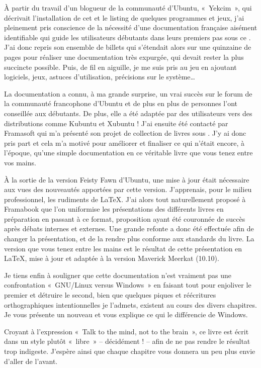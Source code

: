 À partir du travail d'un blogueur de la communauté d'Ubuntu, «~Yekcim~», qui décrivait l'installation de cet  et le listing de quelques programmes et jeux, j'ai pleinement pris conscience de la nécessité d'une documentation française aisément identifiable qui guide les utilisateurs débutants dans leurs premiers pas sous ce . J'ai donc repris son ensemble de billets qui s'étendait alors sur une quinzaine de pages pour réaliser une documentation très expurgée, qui devait rester la plus succincte possible. Puis, de fil en aiguille, je me suis pris au jeu en ajoutant logiciels, jeux, astuces d'utilisation, précisions sur le système\ldots{}\par
La documentation a connu, à ma grande surprise, un vrai succès sur le forum de la communauté francophone d'Ubuntu et de plus en plus de personnes l'ont conseillée aux débutants. De plus, elle a été adaptée par des utilisateurs vers des distributions comme Kubuntu et Xubuntu ! J'ai ensuite été contacté par Framasoft qui m'a présenté son projet de collection de livres sous . J'y ai donc pris part et cela m'a motivé pour améliorer et finaliser ce qui n'était encore, à l'époque, qu'une simple documentation en ce véritable livre que vous tenez entre vos mains.\par
À la sortie de la version Feisty Fawn d'Ubuntu, une mise à jour était nécessaire aux vues des nouveautés apportées par cette version. J'apprenais, pour le milieu professionnel, les rudiments de \LaTeX{}. J'ai alors tout naturellement proposé à Framabook que l'on uniformise les présentations des différents livres en préparation en passant à ce format, proposition ayant été couronnée de succès après débats internes et externes. Une grande refonte a donc été effectuée afin de changer la présentation, et de la rendre plus conforme aux standards du livre. La version que vous tenez entre les mains est le résultat de cette présentation en \LaTeX{}, mise à jour et adaptée à la version Maverick Meerkat (10.10).\par
Je tiens enfin à souligner que cette documentation n'est vraiment pas une confrontation «~GNU/Linux versus Windows~» en faisant tout pour enjoliver le premier et détruire le second, bien que quelques piques et réécritures orthographiques intentionnelles je l'admets, existent au cours des divers chapitres. Je vous présente un nouveau  et vous explique ce qui le différencie de Windows.\par
Croyant à l'expression «~Talk to the mind, not to the brain~», ce livre est écrit dans un style plutôt «~libre~» -- décidément ! -- afin de ne pas rendre le résultat trop indigeste. J'espère ainsi que chaque chapitre vous donnera un peu plus envie d'aller de l'avant.\par
